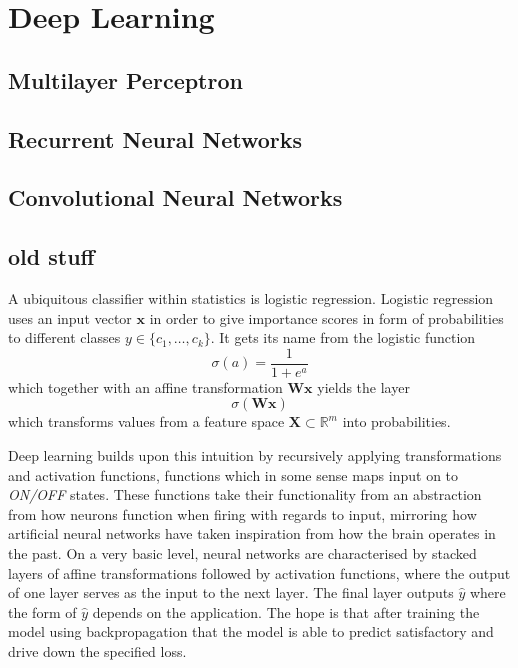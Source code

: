 \section{Deep Learning}

\subsection{Multilayer Perceptron}

\subsection{Recurrent Neural Networks}

\subsection{Convolutional Neural Networks}



\subsection{old stuff}
A ubiquitous classifier within statistics is logistic regression. Logistic
regression uses an input vector $\bm{x}$ in order to give importance scores in
form of probabilities to different classes $y \in \{c_1, \dots, c_k\}$. It gets
its name from the logistic function
\begin{equation}
  \label{eq:logistic_function}
  \sigma(a) = \frac{1}{1 + e^{a}}
\end{equation}
which together with an affine transformation $\bm{W} \bm{x}$ yields the layer
\begin{equation*}
  \sigma(\bm{W} \bm{x})
\end{equation*}
which transforms values from a feature space $\bm{X} \subset \mathbb{R}^m$ into
probabilities\cite{Bishop:2006}.

Deep learning builds upon this intuition by recursively applying transformations
and activation functions, functions which in some sense maps input on to
\textit{ON/OFF} states. These functions take their functionality from an
abstraction from how neurons function when firing with regards to input,
mirroring how artificial neural networks have taken inspiration from how the
brain operates in the past. On a very basic level, neural networks are
characterised by stacked layers of affine transformations followed by activation
functions, where the output of one layer serves as the input to the next layer.
The final layer outputs $\hat{y}$ where the form of $\hat{y}$ depends on the application.
The hope is that after training the model using
backpropagation\cite{Rumelhart:1995:BBT:201784.201785} that the model is able to
predict satisfactory and drive down the specified loss.

